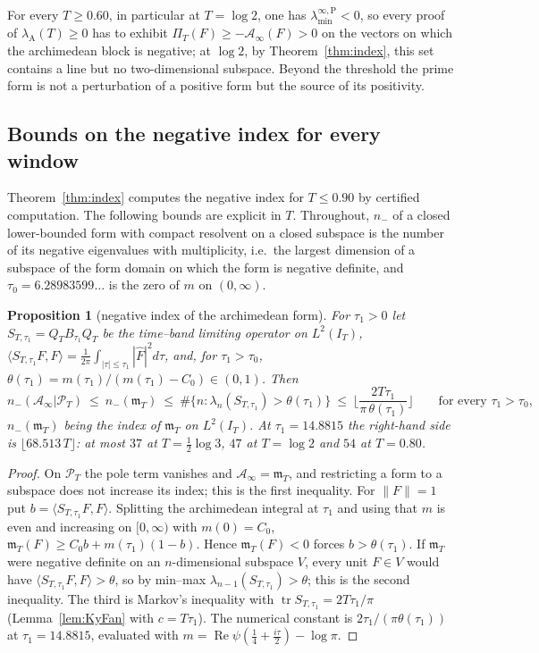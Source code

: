 \documentclass[11pt]{amsart}
\newtheorem{proposition}[theorem]{Proposition}
\theoremstyle{definition}
\theoremstyle{remark}
\newcommand{\Rel}{\operatorname{Re}}
\newcommand{\PT}{\mathcal P_T}
\newcommand{\IT}{I_T}
\newcommand{\lamA}{\lambda_{\mathrm A}(T)}
\newcommand{\Fh}{\widehat F}
\newcommand{\Ainf}{\mathcal A_\infty}
\newcommand{\PiT}{\Pi_T}
\newcommand{\mT}{\mathfrak m_T}
\newcommand{\laminfP}{\lambda^{\infty,\mathrm P}_{\min}}
\begin{document}
For every $T\ge0.60$, in particular at $T=\log2$, one has $\laminfP<0$, so every proof of $\lamA\ge0$
has to exhibit $\PiT(F)\ge-\Ainf(F)>0$ on the vectors on which the archimedean block is negative; at
$\log2$, by Theorem~\ref{thm:index}, this set contains a line but no two-dimensional subspace. Beyond the
threshold the prime form is not a perturbation of a positive form but the source of its positivity.


\subsection{Bounds on the negative index for every window}\label{subsec:negindex}

Theorem~\ref{thm:index} computes the negative index for $T\le0.90$ by certified computation. The
following bounds are explicit in $T$. Throughout, $n_-$ of a closed lower-bounded form with compact
resolvent on a closed subspace is the number of its negative eigenvalues with multiplicity, i.e.\ the
largest dimension of a subspace of the form domain on which the form is negative definite, and
$\tau_0=6.28983599\ldots$ is the zero of $m$ on $(0,\infty)$.

\begin{proposition}[negative index of the archimedean form]\label{prop:NC}
For $\tau_1>0$ let $S_{T,\tau_1}=Q_TB_{\tau_1}Q_T$ be the time--band limiting operator on $L^2(\IT)$,
$\langle S_{T,\tau_1}F,F\rangle=\frac1{2\pi}\int_{|\tau|\le\tau_1}|\Fh|^2d\tau$, and, for $\tau_1>\tau_0$,
$\theta(\tau_1)=m(\tau_1)/(m(\tau_1)-C_0)\in(0,1)$. Then
\[
n_-(\Ainf|\PT)\ \le\ n_-(\mT)\ \le\ \#\{n:\lambda_n(S_{T,\tau_1})>\theta(\tau_1)\}\ \le\
\Big\lfloor\frac{2T\tau_1}{\pi\,\theta(\tau_1)}\Big\rfloor
\qquad\text{for every }\tau_1>\tau_0,
\]
$n_-(\mT)$ being the index of $\mT$ on $L^2(\IT)$. At $\tau_1=14.8815$ the right-hand side is
$\lfloor68.513\,T\rfloor$: at most $37$ at $T=\frac12\log3$, $47$ at $T=\log2$ and $54$ at $T=0.80$.
\end{proposition}
\begin{proof}
On $\PT$ the pole term vanishes and $\Ainf=\mT$, and restricting a form to a subspace does not increase its
index; this is the first inequality. For $\|F\|=1$ put $b=\langle S_{T,\tau_1}F,F\rangle$. Splitting the
archimedean integral at $\tau_1$ and using that $m$ is even and increasing on $[0,\infty)$ with $m(0)=C_0$,
$\mT(F)\ge C_0b+m(\tau_1)(1-b)$. Hence $\mT(F)<0$ forces $b>\theta(\tau_1)$. If $\mT$ were negative
definite on an $n$-dimensional subspace $V$, every unit $F\in V$ would have
$\langle S_{T,\tau_1}F,F\rangle>\theta$, so by min--max $\lambda_{n-1}(S_{T,\tau_1})>\theta$; this is the
second inequality. The third is Markov's inequality with $\operatorname{tr}S_{T,\tau_1}=2T\tau_1/\pi$
(Lemma~\ref{lem:KyFan} with $c=T\tau_1$). The numerical constant is $2\tau_1/(\pi\theta(\tau_1))$ at
$\tau_1=14.8815$, evaluated with $m=\Rel\psi(\frac14+\frac{i\tau}2)-\log\pi$.
\end{proof}
\end{document}
